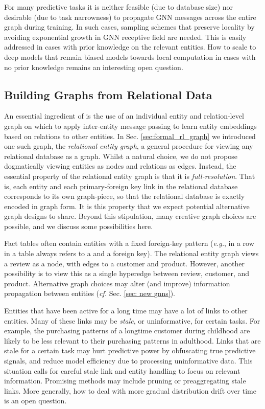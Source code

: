  For many predictive tasks it is neither feasible (due to database size) nor desirable (due to task narrowness) to propagate GNN messages across the entire graph during training. In such cases, sampling schemes that preserve locality by avoiding exponential growth in GNN receptive field are needed. This is easily addressed in cases with  prior knowledge on the relevant entities. How to scale to deep models that remain biased models towards local computation in cases with no prior knowledge remains an interesting open question.



\subsection{Building Graphs from Relational Data}

An essential ingredient of \AreaName is the use of an individual entity and relation-level graph on which to apply inter-entity message passing to learn entity embeddings based on relations to other entities.  In Sec. \ref{sec:formal_rl_graph} we introduced one such graph, the \emph{relational entity graph}, a general procedure for viewing any relational database as a graph. Whilst a natural choice, we do not propose dogmatically viewing entities as nodes and relations as edges.  Instead, the essential property of the relational entity graph is that it is \emph{full-resolution}. That is, each entity and each primary-foreign key link in the relational database corresponds to its own graph-piece, so that the relational database is exactly encoded in graph form. It is this property that we expect potential alternative graph designs to share. Beyond this stipulation, many creative graph choices are possible, and we discuss some possibilities here.


 Fact tables often contain entities with a fixed foreign-key pattern (\emph{e.g.}, in \Amazon a row in a  table always refers to a  and a  foreign key). The relational entity graph views a review as a node, with edges to a customer and product. However, another possibility is to view this as a single hyperedge between review, customer, and product. Alternative graph choices may alter (and improve) information propagation between entities (\emph{cf.} Sec. \ref{sec: new gnns}). 


 Entities that have been active for a long time may have a lot of links to other entities. Many of these links may be \emph{stale}, or uninformative, for certain tasks. For example, the purchasing patterns of a longtime customer during childhood are likely to be less relevant to their purchasing patterns in adulthood. Links that are stale for a certain task may hurt predictive power by obfuscating true predictive signals, and reduce model efficiency due to processing uninformative data. This situation calls for careful stale link and entity handling to focus on relevant information. Promising methods may include pruning or preaggregating stale links. More generally, how to deal with more gradual distribution drift over time is an open question. 


